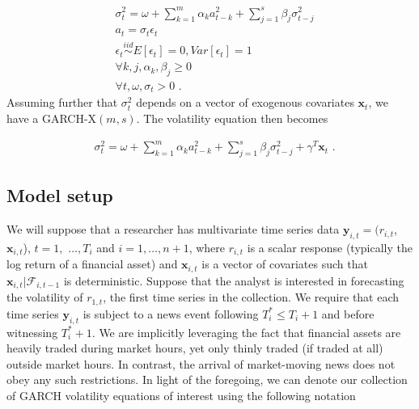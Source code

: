 \documentclass[11pt,3p,review,authoryear]{elsarticle}
\newcommand{\y}{\textbf{y}}
\newcommand{\x}{\textbf{x}}
\newcommand{\simiid}{\stackrel{iid}{\sim}} %
\theoremstyle{definition}
\begin{document}
\begin{align*}
&\sigma_{t}^{2} = \omega + \sum^{m}_{k=1}\alpha_{k}a^{2}_{t-k} + \sum_{j=1}^{s}\beta_{j}\sigma_{t-j}^{2}\\
&a_{t} = \sigma_{t}\epsilon_{t}\\
&\epsilon_{t} \simiid E[\epsilon_{t}]=0, Var[\epsilon_{t}] = 1\\
&\forall k,j, \alpha_{k},\beta_{j}\geq 0\\ 
&\forall t, \omega, \sigma_{t} > 0 \text { .} 
\end{align*}
Assuming further that $\sigma^{2}_{t}$ depends on a vector of exogenous covariates $\x_{t}$, we have a  GARCH-X$(m,s)$.  The volatility equation then becomes 

\begin{align}
&\sigma_{t}^{2} = \omega+ \sum^{m}_{k=1}\alpha_{k}a^{2}_{t-k} + \sum_{j=1}^{s}\beta_{j}\sigma_{t-j}^{2} + \gamma^{T}\x_{t} \text{ .}\label{GARCH-X}
\end{align}


\subsection{Model setup}
\label{modelsetup}
We will suppose that a researcher has multivariate time series data $\y_{i,t} = (r_{i,t}$, $\x_{i,t}$), $t = 1,$ $\ldots,  T_i$ and $i = 1, \ldots, n+1$, where $r_{i,t}$ is a scalar response (typically the log return of a financial asset) and  $\textbf{x}_{i,t}$ is a vector of covariates such that $\x_{i,t}|\mathcal{F}_{i,t-1}$ is deterministic.  Suppose that the analyst is interested in forecasting the volatility of $r_{1,t}$, the first time series in the collection.  We require that each time series $\y_{i,t}$ is subject to a news event following $T^*_i \leq T_{i} + 1$ and before witnessing $T^*_i+1$.  We are implicitly leveraging the fact that financial assets are heavily traded during market hours, yet only thinly traded (if traded at all) outside market hours.  In contrast, the arrival of market-moving news does not obey any such restrictions.  In light of the foregoing, we can denote our collection of GARCH volatility equations of interest using the following notation
\end{document}
